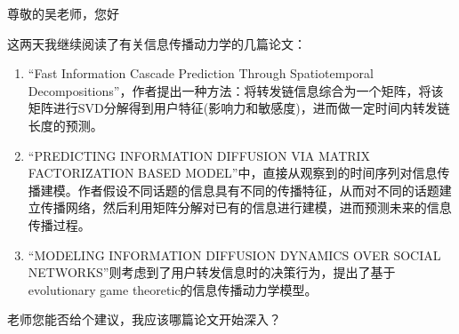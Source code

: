 \documentclass[UTF8]{ctexart}
\begin{document}
\par 尊敬的吴老师，您好
\newline
\par
这两天我继续阅读了有关信息传播动力学的几篇论文：
\begin{enumerate}[\indent 1)]
\item
“Fast Information Cascade Prediction Through Spatiotemporal Decompositions”，作者提出一种方法：将转发链信息综合为一个矩阵，将该矩阵进行SVD分解得到用户特征(影响力和敏感度)，进而做一定时间内转发链长度的预测。
\item
“PREDICTING INFORMATION DIFFUSION VIA MATRIX FACTORIZATION BASED MODEL”中，直接从观察到的时间序列对信息传播建模。作者假设不同话题的信息具有不同的传播特征，从而对不同的话题建立传播网络，然后利用矩阵分解对已有的信息进行建模，进而预测未来的信息传播过程。
\item
“MODELING INFORMATION DIFFUSION DYNAMICS OVER SOCIAL NETWORKS”则考虑到了用户转发信息时的决策行为，提出了基于evolutionary game theoretic的信息传播动力学模型。
\end{enumerate}
\par 老师您能否给个建议，我应该哪篇论文开始深入？
\newline
\newline
\par {}
\end{document}
